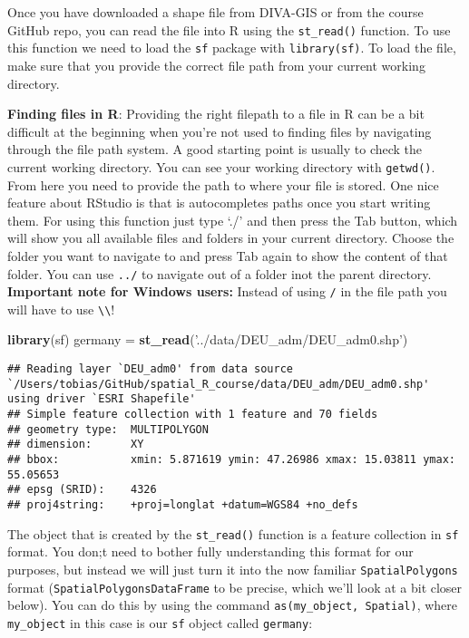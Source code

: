 \documentclass[]{article}
\newenvironment{Shaded}{\begin{snugshade}}{\end{snugshade}}
\newcommand{\KeywordTok}[1]{\textcolor[rgb]{0.13,0.29,0.53}{\textbf{#1}}}
\newcommand{\NormalTok}[1]{#1}
\newcommand{\StringTok}[1]{\textcolor[rgb]{0.31,0.60,0.02}{#1}}
\begin{document}
Once you have downloaded a shape file from DIVA-GIS or from the course
GitHub repo, you can read the file into R using the \texttt{st\_read()}
function. To use this function we need to load the \texttt{sf} package
with \texttt{library(sf)}. To load the file, make sure that you provide
the correct file path from your current working directory.

\textbf{Finding files in R}: Providing the right filepath to a file in R
can be a bit difficult at the beginning when you're not used to finding
files by navigating through the file path system. A good starting point
is usually to check the current working directory. You can see your
working directory with \texttt{getwd()}. From here you need to provide
the path to where your file is stored. One nice feature about RStudio is
that is autocompletes paths once you start writing them. For using this
function just type `./' and then press the Tab button, which will show
you all available files and folders in your current directory. Choose
the folder you want to navigate to and press Tab again to show the
content of that folder. You can use \texttt{../} to navigate out of a
folder inot the parent directory. \textbf{Important note for Windows
users:} Instead of using \texttt{/} in the file path you will have to
use \texttt{\textbackslash{}\textbackslash{}}!

\begin{Shaded}
\begin{Highlighting}[]
\KeywordTok{library}\NormalTok{(sf)}
\NormalTok{germany =}\StringTok{ }\KeywordTok{st_read}\NormalTok{(}\StringTok{'../data/DEU_adm/DEU_adm0.shp'}\NormalTok{)}
\end{Highlighting}
\end{Shaded}

\begin{verbatim}
## Reading layer `DEU_adm0' from data source `/Users/tobias/GitHub/spatial_R_course/data/DEU_adm/DEU_adm0.shp' using driver `ESRI Shapefile'
## Simple feature collection with 1 feature and 70 fields
## geometry type:  MULTIPOLYGON
## dimension:      XY
## bbox:           xmin: 5.871619 ymin: 47.26986 xmax: 15.03811 ymax: 55.05653
## epsg (SRID):    4326
## proj4string:    +proj=longlat +datum=WGS84 +no_defs
\end{verbatim}

The object that is created by the \texttt{st\_read()} function is a
feature collection in \texttt{sf} format. You don;t need to bother fully
understanding this format for our purposes, but instead we will just
turn it into the now familiar \texttt{SpatialPolygons} format
(\texttt{SpatialPolygonsDataFrame} to be precise, which we'll look at a
bit closer below). You can do this by using the command
\texttt{as(my\_object,\ \textquotesingle{}Spatial\textquotesingle{})},
where \texttt{my\_object} in this case is our \texttt{sf} object called
\texttt{germany}:
\end{document}
